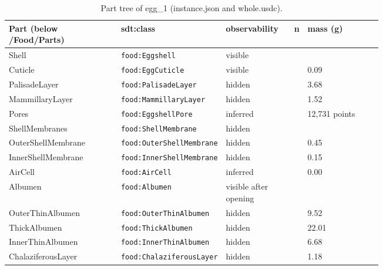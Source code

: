 \documentclass[10.5pt,a4paper]{article}
\begin{document}
\begin{table}[htbp]\centering\scriptsize\caption{Part tree of egg\_1 (instance.json and whole.usdc).}
\begin{tabularx}{\linewidth}{@{}p{0.30\linewidth}p{0.27\linewidth}p{0.17\linewidth}rX@{}}\toprule Part (below /Food/Parts) & sdt:class & observability & n & mass (g) \\\midrule
\hspace*{0.0em}Shell & \texttt{food:Eggshell} & visible &  &  \\
\hspace*{0.9em}Cuticle & \texttt{food:EggCuticle} & visible &  & 0.09 \\
\hspace*{0.9em}PalisadeLayer & \texttt{food:PalisadeLayer} & hidden &  & 3.68 \\
\hspace*{0.9em}MammillaryLayer & \texttt{food:MammillaryLayer} & hidden &  & 1.52 \\
\hspace*{0.9em}Pores & \texttt{food:EggshellPore} & inferred &  & 12,731 points \\
\hspace*{0.0em}ShellMembranes & \texttt{food:ShellMembrane} & hidden &  &  \\
\hspace*{0.9em}OuterShellMembrane & \texttt{food:OuterShellMembrane} & hidden &  & 0.45 \\
\hspace*{0.9em}InnerShellMembrane & \texttt{food:InnerShellMembrane} & hidden &  & 0.15 \\
\hspace*{0.0em}AirCell & \texttt{food:AirCell} & inferred &  & 0.00 \\
\hspace*{0.0em}Albumen & \texttt{food:Albumen} & visible after opening &  &  \\
\hspace*{0.9em}OuterThinAlbumen & \texttt{food:OuterThinAlbumen} & hidden &  & 9.52 \\
\hspace*{0.9em}ThickAlbumen & \texttt{food:ThickAlbumen} & hidden &  & 22.01 \\
\hspace*{0.9em}InnerThinAlbumen & \texttt{food:InnerThinAlbumen} & hidden &  & 6.68 \\
\hspace*{0.9em}ChalaziferousLayer & \texttt{food:ChalaziferousLayer} & hidden &  & 1.18 \\

\end{tabularx}
\end{table}
\end{document}
